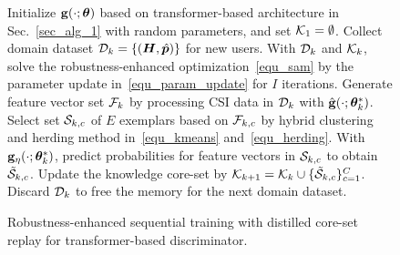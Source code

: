 \begin{figure}[!t]
    \vspace{-0.7em}
    \begin{algorithm}[H]
    \small
    \caption{Robustness-enhanced sequential training with distilled core-set replay for transformer-based discriminator.}
    \label{alg_overall}
    \begin{algorithmic} [1]
        \Require {}
        \State Initialize $\mathbf{g}(\cdot; \bm\theta)$ based on transformer-based architecture in Sec.~\ref{sec_alg_1} with random parameters, and set $\mathcal{K}_1=\emptyset$.
            \State Collect domain dataset $\mathcal{D}_{k} = \{(\bm H, \hat{\bm p})\}$ for new users. 
            \State With $\mathcal{D}_{k}$ and $\mathcal{K}_{k}$, solve the robustness-enhanced optimization~\eqref{equ_sam} by the parameter update in~\eqref{equ_param_update} for $I$ iterations.
            \State Generate feature vector set $\mathcal{F}_k$ by processing CSI data in $\mathcal{D}_k$ with $\hat{\mathbf{g}}(\cdot;\bm\theta^*_k)$. 
                \State Select set ${\mathcal{S}}_{k,c}$ of $E$ exemplars based on $\mathcal{F}_{k,c}$ by hybrid clustering and herding method in~\eqref{equ_kmeans} and~\eqref{equ_herding}. 
                \State With $\mathbf{g}_{\eta}(\cdot;\bm\theta^*_k)$, predict probabilities for feature vectors in $\mathcal{S}_{k,c}$ to obtain $\tilde{\mathcal{S}}_{k,c}$.
            \EndFor
            \State Update the knowledge core-set by $\mathcal{K}_{k+1} = \mathcal{K}_{k} \cup \{\tilde{\mathcal{S}}_{k,c}\}_{c=1}^C$.
            \State Discard $\mathcal{D}_k$ to free the memory for the next domain dataset.
        \EndFor
    \end{algorithmic}
\end{algorithm}
\vspace{-1.em}
\end{figure}
\endinput

